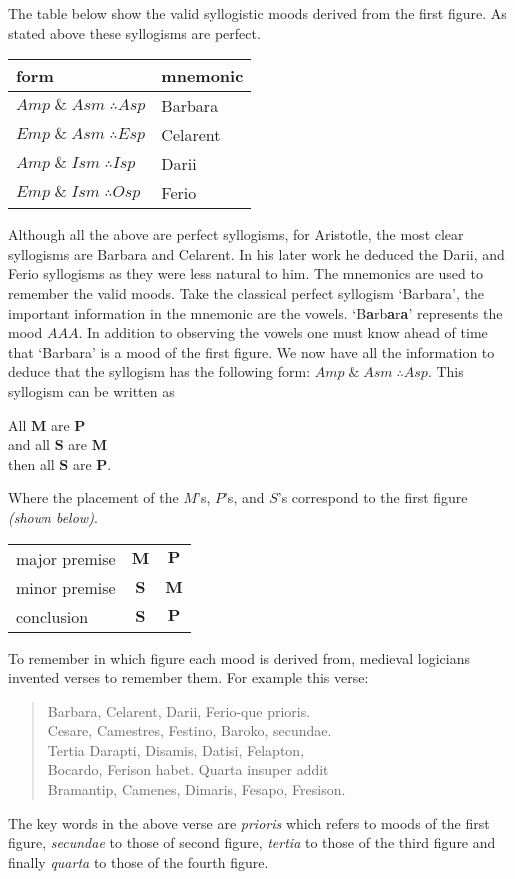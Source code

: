 \documentclass[12pt]{article}
\begin{document}
The table below show the valid syllogistic moods derived from the first figure.  As stated above these syllogisms are perfect.
\begin{center}
\begin{tabular}{l l}
\textbf{form} & \textbf{mnemonic}\\
\hline
$Amp \;\&\; Asm\;\therefore Asp$ & Barbara\\
$Emp \;\&\; Asm\;\therefore Esp$ & Celarent\\
$Amp \;\&\; Ism\;\therefore Isp$ & Darii\\
$Emp \;\&\; Ism\;\therefore Osp$ & Ferio
\end{tabular}
\end{center}
Although all the above are perfect syllogisms, for Aristotle, the most clear syllogisms are Barbara and Celarent.  In his later work he deduced the Darii, and Ferio syllogisms as they were less natural to him.\cite{LJ} The mnemonics are used to remember the valid moods.  Take the classical perfect syllogism `Barbara', the important information in the mnemonic are the vowels.  `B\textbf{a}rb\textbf{a}r\textbf{a}' represents the mood $AAA$.  In addition to observing the vowels one must know ahead of time that `Barbara' is a mood of the first figure.  We now have all the information to deduce that the syllogism has the following form: $Amp \;\&\; Asm\;\therefore Asp$.  This syllogism can be written as
\begin{center}
All $\textbf{M}$ are $\textbf{P}$\\
and all $\textbf{S}$ are $\textbf{M}$\\
then all $\textbf{S}$ are $\textbf{P}$.
\end{center}
Where the placement of the $M$'s, $P$'s, and $S$'s correspond to the first figure \textit{(shown below)}.
\begin{center}
\begin{tabular}{l| c c}
major premise & $\textbf{M}$ & $\textbf{P}$\\
minor premise & $\textbf{S}$ & $\textbf{M}$\\
conclusion & $\textbf{S}$ & $\textbf{P}$
\end{tabular}
\end{center}

To remember in which figure each mood is derived from, medieval logicians invented verses to remember them.  For example this verse:
\begin{quote}
Barbara, Celarent, Darii, Ferio-que prioris.\\
Cesare, Camestres, Festino, Baroko, secundae.\\
Tertia Darapti, Disamis, Datisi, Felapton,\\
Bocardo, Ferison habet. Quarta insuper addit\\
Bramantip, Camenes, Dimaris, Fesapo, Fresison.
\end{quote}
The key words in the above verse are \textit{prioris} which refers to moods of the first figure, \textit{secundae} to those of second figure, \textit{tertia} to those of the third figure and finally \textit{quarta} to those of the fourth figure.
\end{document}
